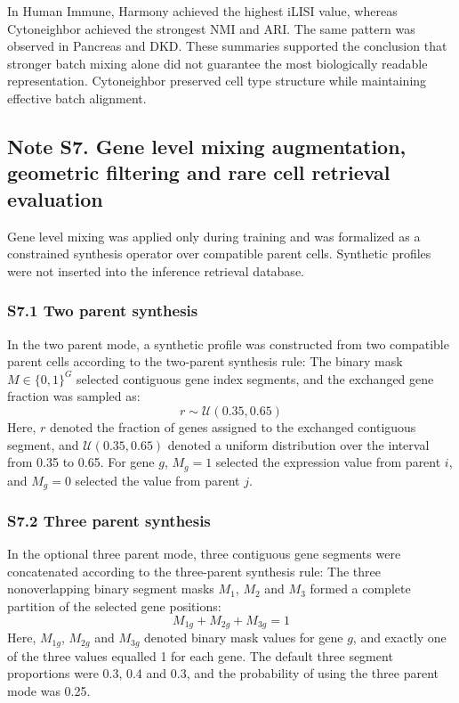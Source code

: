 \documentclass[11pt]{article}
\begin{document}
In Human Immune, Harmony achieved the highest iLISI value, whereas Cytoneighbor achieved the strongest NMI and ARI. The same pattern was observed in Pancreas and DKD. These summaries supported the conclusion that stronger batch mixing alone did not guarantee the most biologically readable representation. Cytoneighbor preserved cell type structure while maintaining effective batch alignment.

\subsection*{Note S7. Gene level mixing augmentation, geometric filtering and rare cell retrieval evaluation}

Gene level mixing was applied only during training and was formalized as a constrained synthesis operator over compatible parent cells. Synthetic profiles were not inserted into the inference retrieval database.

\subsubsection*{S7.1 Two parent synthesis}

In the two parent mode, a synthetic profile was constructed from two compatible parent cells according to the two-parent synthesis rule: The binary mask \(M \in \{0,1\}^{G}\) selected contiguous gene index segments, and the exchanged gene fraction was sampled as:
\begin{equation}
r \sim \mathcal{U}(0.35,0.65)
\label{eq:cutmix_ratio}
\end{equation}
Here, \(r\) denoted the fraction of genes assigned to the exchanged contiguous segment, and \(\mathcal{U}(0.35,0.65)\) denoted a uniform distribution over the interval from 0.35 to 0.65. For gene \(g\), \(M_g=1\) selected the expression value from parent \(i\), and \(M_g=0\) selected the value from parent \(j\).
\subsubsection*{S7.2 Three parent synthesis}

In the optional three parent mode, three contiguous gene segments were concatenated according to the three-parent synthesis rule: The three nonoverlapping binary segment masks \(M_1\), \(M_2\) and \(M_3\) formed a complete partition of the selected gene positions:
\begin{equation}
M_{1g}+M_{2g}+M_{3g}=1
\label{eq:cutmix_three_mask}
\end{equation}
Here, \(M_{1g}\), \(M_{2g}\) and \(M_{3g}\) denoted binary mask values for gene \(g\), and exactly one of the three values equalled 1 for each gene. The default three segment proportions were 0.3, 0.4 and 0.3, and the probability of using the three parent mode was 0.25.
\end{document}
